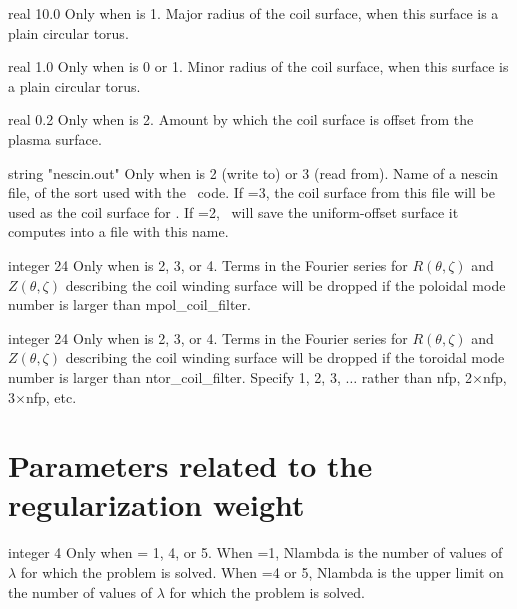 \myhrule

{real}
{10.0}
{Only when  is 1.}
{Major radius of the coil surface, when this surface is a plain circular torus.}

\myhrule

{real}
{1.0}
{Only when  is 0 or 1.}
{Minor radius of the coil surface, when this surface is a plain circular torus.}


\myhrule

{real}
{0.2}
{Only when  is 2.}
{Amount by which the coil surface is offset from the plasma surface.}

\myhrule

{string}
{{\ttfamily "nescin.out"}}
{Only when  is 2 (write to) or 3 (read from).}
{Name of a {\ttfamily nescin} file, of the sort used with the \nescoil~code.
If =3, the coil surface from
this file will be used as the coil surface for \regcoil. 
If =2, \regcoil~will save the uniform-offset surface it computes
into a file with this name.}

\myhrule

{integer}
{24}
{Only when  is 2, 3, or 4.}
{Terms in the Fourier series for $R(\theta,\zeta)$ and $Z(\theta,\zeta)$ describing the coil winding surface will be dropped if the poloidal mode number is larger than {\ttfamily mpol\_coil\_filter}.}

\myhrule

{integer}
{24}
{Only when  is 2, 3, or 4.}
{Terms in the Fourier series for $R(\theta,\zeta)$ and $Z(\theta,\zeta)$ describing the coil winding surface will be dropped if the toroidal mode number is larger than {\ttfamily ntor\_coil\_filter}. Specify 1, 2, 3, $\ldots$ rather than {\ttfamily nfp}, 2$\times${\ttfamily nfp}, 3$\times${\ttfamily nfp}, etc.}


\section{Parameters related to the regularization weight}

{integer}
{4}
{Only when  = 1, 4, or 5.}
{When =1, {\ttfamily Nlambda} is the number of values of $\lambda$ for which the problem is solved.
When =4 or 5, {\ttfamily Nlambda} is the upper limit on the number of values of $\lambda$ for which the problem is solved.}


